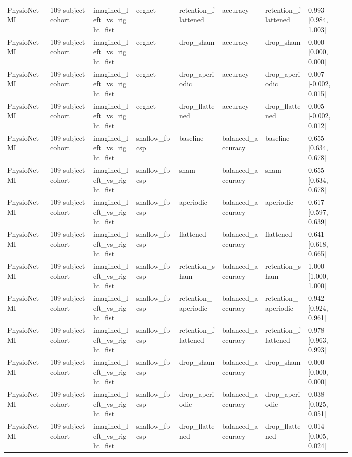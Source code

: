 \begin{longtable}{p{0.10\linewidth}p{0.10\linewidth}p{0.10\linewidth}p{0.10\linewidth}p{0.10\linewidth}p{0.10\linewidth}p{0.10\linewidth}p{0.10\linewidth}}
PhysioNet MI & 109-subject cohort & imagined\_left\_vs\_right\_fist & eegnet & retention\_flattened & accuracy & retention\_flattened & 0.993 [0.984, 1.003]\\
PhysioNet MI & 109-subject cohort & imagined\_left\_vs\_right\_fist & eegnet & drop\_sham & accuracy & drop\_sham & 0.000 [0.000, 0.000]\\
PhysioNet MI & 109-subject cohort & imagined\_left\_vs\_right\_fist & eegnet & drop\_aperiodic & accuracy & drop\_aperiodic & 0.007 [-0.002, 0.015]\\
PhysioNet MI & 109-subject cohort & imagined\_left\_vs\_right\_fist & eegnet & drop\_flattened & accuracy & drop\_flattened & 0.005 [-0.002, 0.012]\\
PhysioNet MI & 109-subject cohort & imagined\_left\_vs\_right\_fist & shallow\_fbcsp & baseline & balanced\_accuracy & baseline & 0.655 [0.634, 0.678]\\
PhysioNet MI & 109-subject cohort & imagined\_left\_vs\_right\_fist & shallow\_fbcsp & sham & balanced\_accuracy & sham & 0.655 [0.634, 0.678]\\
PhysioNet MI & 109-subject cohort & imagined\_left\_vs\_right\_fist & shallow\_fbcsp & aperiodic & balanced\_accuracy & aperiodic & 0.617 [0.597, 0.639]\\
PhysioNet MI & 109-subject cohort & imagined\_left\_vs\_right\_fist & shallow\_fbcsp & flattened & balanced\_accuracy & flattened & 0.641 [0.618, 0.665]\\
PhysioNet MI & 109-subject cohort & imagined\_left\_vs\_right\_fist & shallow\_fbcsp & retention\_sham & balanced\_accuracy & retention\_sham & 1.000 [1.000, 1.000]\\
PhysioNet MI & 109-subject cohort & imagined\_left\_vs\_right\_fist & shallow\_fbcsp & retention\_aperiodic & balanced\_accuracy & retention\_aperiodic & 0.942 [0.924, 0.961]\\
PhysioNet MI & 109-subject cohort & imagined\_left\_vs\_right\_fist & shallow\_fbcsp & retention\_flattened & balanced\_accuracy & retention\_flattened & 0.978 [0.963, 0.993]\\
PhysioNet MI & 109-subject cohort & imagined\_left\_vs\_right\_fist & shallow\_fbcsp & drop\_sham & balanced\_accuracy & drop\_sham & 0.000 [0.000, 0.000]\\
PhysioNet MI & 109-subject cohort & imagined\_left\_vs\_right\_fist & shallow\_fbcsp & drop\_aperiodic & balanced\_accuracy & drop\_aperiodic & 0.038 [0.025, 0.051]\\
PhysioNet MI & 109-subject cohort & imagined\_left\_vs\_right\_fist & shallow\_fbcsp & drop\_flattened & balanced\_accuracy & drop\_flattened & 0.014 [0.005, 0.024]\\

\end{longtable}
